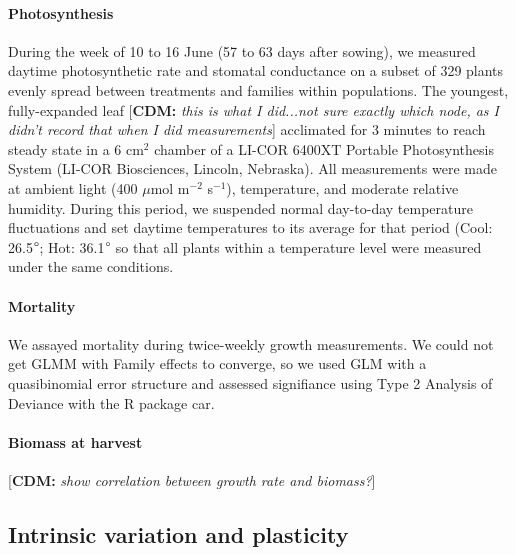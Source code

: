 \documentclass[11pt, oneside]{article}
\newcommand{\pkg}[1]{{\fontseries{b}\selectfont #1}}
\newcommand{\cdm}[1]{{ \color{magenta} [{\bf{CDM:}} {\em#1}]}} %
\begin{document}
\paragraph{Photosynthesis}
During the week of 10 to 16 June (57 to 63 days after sowing), we measured daytime photosynthetic rate and stomatal conductance on a subset of 329 plants evenly spread between treatments and families within populations. The youngest, fully-expanded leaf \cdm{this is what I did...not sure exactly which node, as I didn't record that when I did measurements} acclimated for 3 minutes to reach steady state in a 6 cm$^2$ chamber of a LI-COR 6400XT Portable Photosynthesis System (LI-COR Biosciences, Lincoln, Nebraska). All measurements were made at ambient light (400 $\mu$mol m$^{-2}$ s$^{-1}$), temperature, and moderate relative humidity. During this period, we suspended normal day-to-day temperature fluctuations and set daytime temperatures to its average for that period (Cool: 26.5$\degree$; Hot: 36.1$\degree$ so that all plants within a temperature level were measured under the same conditions.


\paragraph{Mortality}
We assayed mortality during twice-weekly growth measurements. We could not get GLMM with Family effects to converge, so we used GLM with a quasibinomial error structure and assessed signifiance using Type 2 Analysis of Deviance with the R package \pkg{car}. 


\paragraph{Biomass at harvest} 

\cdm{show correlation between growth rate and biomass?}

\subsection*{Intrinsic variation and plasticity}
\end{document}
